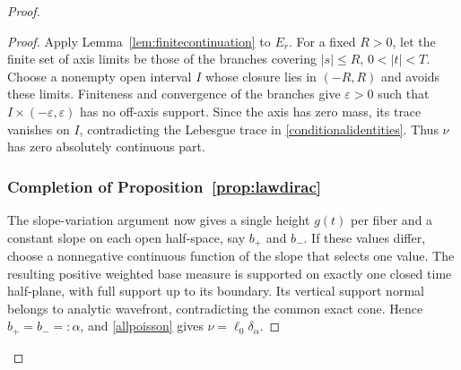 \documentclass[11pt]{article}
\begin{document}
\begin{proof}
\begin{proof}
Apply Lemma~\ref{lem:finitecontinuation} to $E_r$. For a fixed $R>0$, let the finite set of axis limits be those of the branches covering $|s|\le R$, $0<|t|<T$. Choose a nonempty open interval $I$ whose closure lies in $(-R,R)$ and avoids these limits. Finiteness and convergence of the branches give $\varepsilon>0$ such that $I\times(-\varepsilon,\varepsilon)$ has no off-axis support. Since the axis has zero mass, its trace vanishes on $I$, contradicting the Lebesgue trace in \eqref{conditionalidentities}. Thus $\nu$ has zero absolutely continuous part.

\subsubsection{Completion of Proposition~\ref{prop:lawdirac}}
The slope-variation argument now gives a single height $g(t)$ per fiber and a constant slope on each open half-space, say $b_+$ and $b_-$. If these values differ, choose a nonnegative continuous function of the slope that selects one value. The resulting positive weighted base measure is supported on exactly one closed time half-plane, with full support up to its boundary. Its vertical support normal belongs to analytic wavefront, contradicting the common exact cone. Hence $b_+=b_-=: \alpha$, and \eqref{allpoisson} gives $\nu=\ell_0\delta_\alpha$.
\end{proof}

\end{proof}
\end{document}
